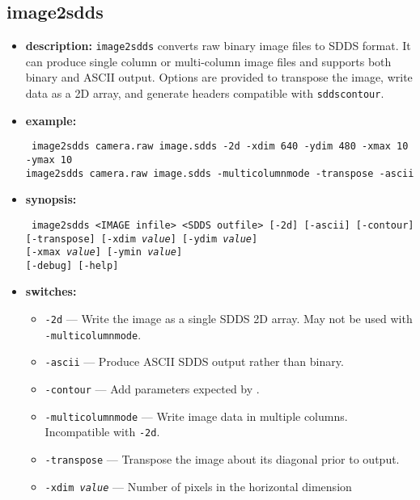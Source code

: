 %
\newpage
\subsection{image2sdds}
\label{image2sdds}

\begin{itemize}
\item {\bf description:} \verb|image2sdds| converts raw binary image files to SDDS format. It can
  produce single column or multi-column image files and supports both
  binary and ASCII output.  Options are provided to transpose the image,
  write data as a 2D array, and generate headers compatible with
  \verb|sddscontour|.
\item {\bf example:}
\begin{flushleft}{\tt
image2sdds camera.raw image.sdds -2d -xdim 640 -ydim 480 -xmax 10 -ymax 10\\
image2sdds camera.raw image.sdds -multicolumnmode -transpose -ascii
}\end{flushleft}
\item {\bf synopsis:}
\begin{flushleft}{\tt
image2sdds <IMAGE infile> <SDDS outfile> [-2d] [-ascii] [-contour]\\
    [-multicolumnmode] [-transpose] [-xdim {\em value}] [-ydim {\em value}]\\
    [-xmin {\em value}] [-xmax {\em value}] [-ymin {\em value}]\\
    [-ymax {\em value}] [-debug] [-help]
}\end{flushleft}
\item {\bf switches:}
  \begin{itemize}
  \item {\tt -2d} --- Write the image as a single SDDS 2D array. May not be used
    with \verb|-multicolumnmode|.
  \item {\tt -ascii} --- Produce ASCII SDDS output rather than binary.
  \item {\tt -contour} --- Add parameters expected by .
  \item {\tt -multicolumnmode} --- Write image data in multiple columns. Incompatible
    with \verb|-2d|.
  \item {\tt -transpose} --- Transpose the image about its diagonal prior to output.
  \item {\tt -xdim {\em value}} --- Number of pixels in the horizontal dimension

\end{itemize}
\end{itemize}
